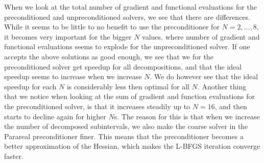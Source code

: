 When we look at the total number of gradient and functional evaluations for the preconditioned and unpreconditioned solvers, we see that there are differences. While it seems to be little to no benefit to use the preconditioner for $N=2,...,8$, it becomes very important for the bigger $N$ values, where number of gradient and functional evaluations seems to explode for the unpreconditioned solver. If one accepts the above solutions as good enough, we see that we for the preconditioned solver get speedup for all decompositions, and that the ideal speedup seems to increase when we increase $N$. We do however see that the ideal speedup for each $N$ is considerably less then optimal for all $N$. Another thing that we notice when looking at the sum of gradient and function evaluations for the preconditioned solver, is that it increases steadily up to $N=16$, and then starts to decline again for higher $N$s. The reason for this is that when we increase the number of decomposed subintervals, we also make the coarse solver in the Parareal preconditioner finer. This means that the preconditioner becomes a better approximation of the Hessian, which makes the L-BFGS iteration converge faster.
